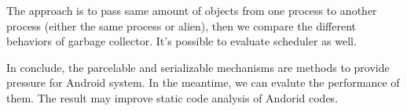 \documentclass[11pt]{article}
\begin{document}
The approach is to pass same amount of objects from one process to another process (either the same process or alien),
then we compare the different behaviors of garbage collector.
It's possible to evaluate scheduler as well.

In conclude, the parcelable and serializable mechanisms are methods to provide pressure for Android system.
In the meantime, we can evalute the performance of them.
The result may improve static code analysis of Andorid codes.
\end{document}
